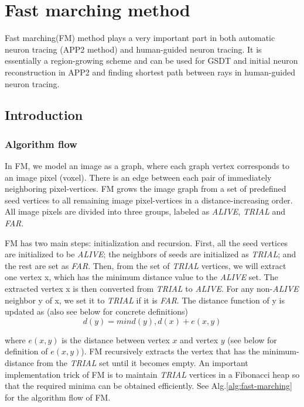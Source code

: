 \chapter{Fast marching method} \label{chpt:fm}
Fast marching(FM) method \cite{sethian1999level} plays a very important part in both automatic neuron tracing (APP2 method) and human-guided neuron tracing. It is essentially a region-growing scheme and can be used for GSDT and initial neuron reconstruction in APP2 and finding shortest path between rays in human-guided neuron tracing.
\section{Introduction}
\subsection{Algorithm flow}
In FM, we model an image as a graph, where each graph vertex corresponds to an image pixel (voxel). There is an edge between each pair of immediately neighboring pixel-vertices. FM grows the image graph from a set of predefined seed vertices to all remaining image pixel-vertices in a distance-increasing order.  All image pixels are divided into three groups, labeled as \emph{ALIVE}, \emph{TRIAL} and \emph{FAR}. 

FM has two main steps: initialization and recursion. First, all the seed vertices are initialized to be \emph{ALIVE}; the neighbors of seeds are initialized as \emph{TRIAL}; and the rest are set as \emph{FAR}. Then, from the set of \emph{TRIAL} vertices, we will extract one vertex x, which has the minimum distance value to the \emph{ALIVE} set. The extracted vertex x is then converted from \emph{TRIAL} to \emph{ALIVE}.  For any non-\emph{ALIVE} neighbor y of x, we set it to \emph{TRIAL} if it is \emph{FAR}. The distance function of y is updated as (also see below for concrete definitions)
\begin{equation}
d(y)=min⁡{d(y),d(x)+e(x,y)}
\end{equation}

where $e(x,y)$ is the distance between vertex $x$ and vertex $y$ (see below for definition of $e(x,y)$). FM recursively extracts the vertex that has the minimum-distance from the \emph{TRIAL} set until it becomes empty.
An important implementation trick of FM is to maintain \emph{TRIAL} vertices in a Fibonacci heap so that the required minima can be obtained efficiently. See Alg.\ref{alg:fast-marching} for the algorithm flow of FM.

